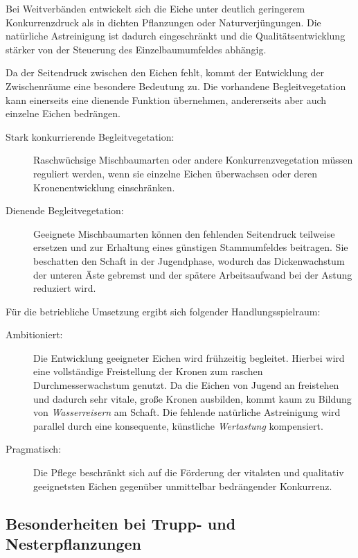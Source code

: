 \documentclass[twocolumn, bibliography=totoc, abstract=true]{scrartcl}
\begin{document}
Bei Weitverbänden entwickelt sich die Eiche unter deutlich geringerem Konkurrenzdruck als in dichten Pflanzungen oder Naturverjüngungen. Die natürliche Astreinigung ist dadurch eingeschränkt und die Qualitätsentwicklung stärker von der Steuerung des Einzelbaumumfeldes abhängig. 

Da der Seitendruck zwischen den Eichen fehlt, kommt der Entwicklung der Zwischenräume eine besondere Bedeutung zu. Die vorhandene Begleitvegetation kann einerseits eine dienende Funktion übernehmen, andererseits aber auch einzelne Eichen bedrängen.

\begin{description}
\item[Stark konkurrierende Begleitvegetation:] Raschwüchsige Mischbaumarten oder andere Konkurrenzvegetation müssen reguliert werden, wenn sie einzelne Eichen überwachsen oder deren Kronenentwicklung einschränken.
\item[Dienende Begleitvegetation:] Geeignete Mischbaumarten können den fehlenden Seitendruck teilweise ersetzen und zur Erhaltung eines günstigen Stammumfeldes beitragen. Sie beschatten den Schaft in der Jugendphase, wodurch das Dickenwachstum der unteren Äste gebremst und der spätere Arbeitsaufwand bei der Astung reduziert wird.
\end{description}

Für die betriebliche Umsetzung ergibt sich folgender Handlungsspielraum:

\begin{description}
\item[Ambitioniert:] Die Entwicklung geeigneter Eichen wird frühzeitig begleitet. Hierbei wird eine vollständige Freistellung der Kronen zum raschen Durchmesserwachstum genutzt. Da die Eichen von Jugend an freistehen und dadurch sehr vitale, große Kronen ausbilden, kommt kaum zu Bildung von \emph{Wasserreisern} am Schaft. Die fehlende natürliche Astreinigung wird parallel durch eine konsequente, künstliche \emph{Wertastung} kompensiert.
\item[Pragmatisch:] Die Pflege beschränkt sich auf die Förderung der vitalsten und qualitativ geeignetsten Eichen gegenüber unmittelbar bedrängender Konkurrenz.
\end{description}

\subsection{Besonderheiten bei Trupp- und Nesterpflanzungen}
\end{document}

